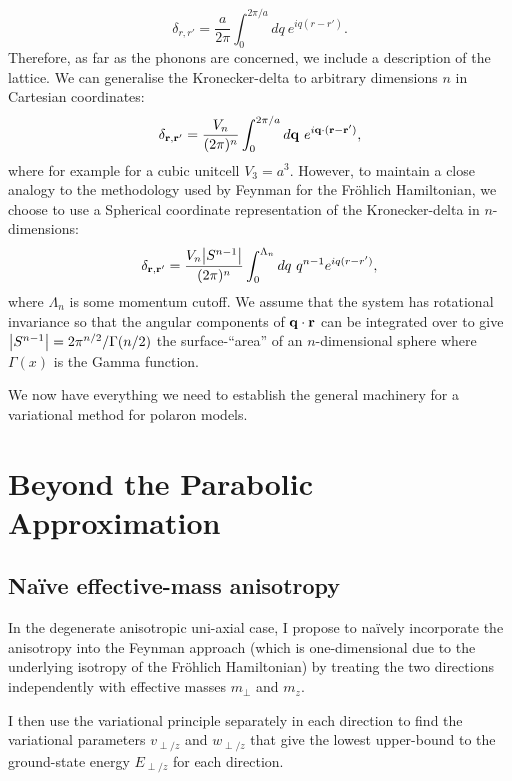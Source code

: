 \begin{equation}
    \delta _{r, r'} = \frac{a}{2\pi} \int_0^{2\pi / a} dq\ e^{i q (r - r')} .
\end{equation}
Therefore, as far as the phonons are concerned, we include a description of the lattice. We can generalise the Kronecker-delta to arbitrary dimensions $n$ in Cartesian coordinates:
\begin{equation}
    \delta_{\vb{r}, \vb{r'}} = \frac{V_n}{(2\pi)^n} \int_0^{2\pi/a} d\vb{q}\ e^{i \vb{q} \cdot (\vb{r} - \vb{r'})} ,
\end{equation}
where for example for a cubic unitcell $V_3 = a^3$. However, to maintain a close analogy to the methodology used by Feynman for the Fr\"ohlich Hamiltonian, we choose to use a Spherical coordinate representation of the Kronecker-delta in $n$-dimensions:
\begin{equation}
    \delta_{\vb{r}, \vb{r'}} = \frac{V_n \abs{S^{n-1}}}{(2\pi)^n} \int_0^{\Lambda_n} dq\ q^{n-1} e^{i q (r - r')} ,
\end{equation}
where $\Lambda_n$ is some momentum cutoff. We assume that the system has rotational invariance so that the angular components of $\vb{q} \cdot \vb{r}$ can be integrated over to give $\abs{S^{n-1}} = 2\pi^{n/2} / \Gamma(n/2)$ the surface-``area'' of an $n$-dimensional sphere where $\Gamma(x)$ is the Gamma function.

We now have everything we need to establish the general machinery for a variational method for polaron models.

\section{Beyond the Parabolic Approximation}
\label{sec:3-2}

\subsection{Na\"ive effective-mass anisotropy}
\label{subsec:3-2-1}

In the degenerate anisotropic uni-axial case, I propose to na\"ively incorporate the anisotropy into the Feynman approach (which is one-dimensional due to the underlying isotropy of the Fr\"ohlich Hamiltonian) by treating the two directions independently with effective masses $m_\perp$ and $m_z$.

I then use the variational principle separately in each direction to find the variational parameters $v_{\perp/z}$ and $w_{\perp/z}$ that give the lowest upper-bound to the ground-state energy $E_{\perp/z}$ for each direction. 

